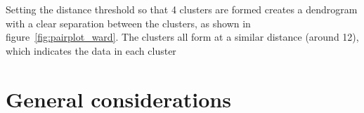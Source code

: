 Setting the distance threshold so that 4 clusters are formed creates a dendrogram with a clear
separation between the clusters, as shown in figure~\ref{fig:pairplot_ward}.
The clusters all form at a similar distance (around 12), which indicates the data in each cluster








\section{General considerations}\label{sec:considerations}